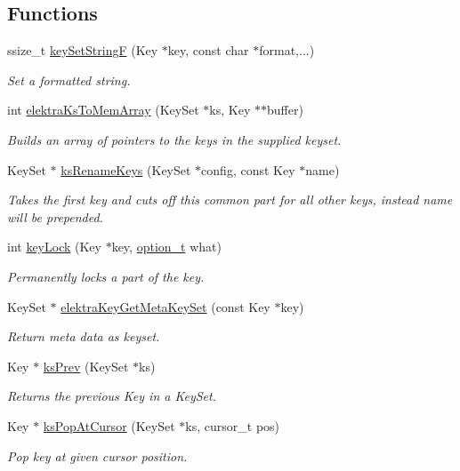 \subsection*{Functions}
\begin{DoxyCompactItemize}
\item 
ssize\+\_\+t \hyperlink{group__api_ga812eb6c4f506dafa5733bf531c52199c}{key\+Set\+String\+F} (Key $\ast$key, const char $\ast$format,...)
\begin{DoxyCompactList}\small\item\em Set a formatted string. \end{DoxyCompactList}\item 
int \hyperlink{group__api_gac3e995819383f904369c260f212125f5}{elektra\+Ks\+To\+Mem\+Array} (Key\+Set $\ast$ks, Key $\ast$$\ast$buffer)
\begin{DoxyCompactList}\small\item\em Builds an array of pointers to the keys in the supplied keyset. \end{DoxyCompactList}\item 
Key\+Set $\ast$ \hyperlink{group__api_ga7557d07db07649b9d81e6da63ce59376}{ks\+Rename\+Keys} (Key\+Set $\ast$config, const Key $\ast$name)
\begin{DoxyCompactList}\small\item\em Takes the first key and cuts off this common part for all other keys, instead name will be prepended. \end{DoxyCompactList}\item 
int \hyperlink{group__api_ga2dd8d2650e59a90e933c631267bfbb85}{key\+Lock} (Key $\ast$key, \hyperlink{group__keyset_ga98a3d6a4016c9dad9cbd1a99a9c2a45a}{option\+\_\+t} what)
\begin{DoxyCompactList}\small\item\em Permanently locks a part of the key. \end{DoxyCompactList}\item 
Key\+Set $\ast$ \hyperlink{group__api_ga48120f254e09e0c5cceff4864f110ceb}{elektra\+Key\+Get\+Meta\+Key\+Set} (const Key $\ast$key)
\begin{DoxyCompactList}\small\item\em Return meta data as keyset. \end{DoxyCompactList}\item 
Key $\ast$ \hyperlink{group__api_gae7d268f13dd89a6e126b3718b117996f}{ks\+Prev} (Key\+Set $\ast$ks)
\begin{DoxyCompactList}\small\item\em Returns the previous Key in a Key\+Set. \end{DoxyCompactList}\item 
Key $\ast$ \hyperlink{group__api_ga32f8e3258033e970589f23d9d7102bd1}{ks\+Pop\+At\+Cursor} (Key\+Set $\ast$ks, cursor\+\_\+t pos)
\begin{DoxyCompactList}\small\item\em Pop key at given cursor position. \end{DoxyCompactList}\end{DoxyCompactItemize}



